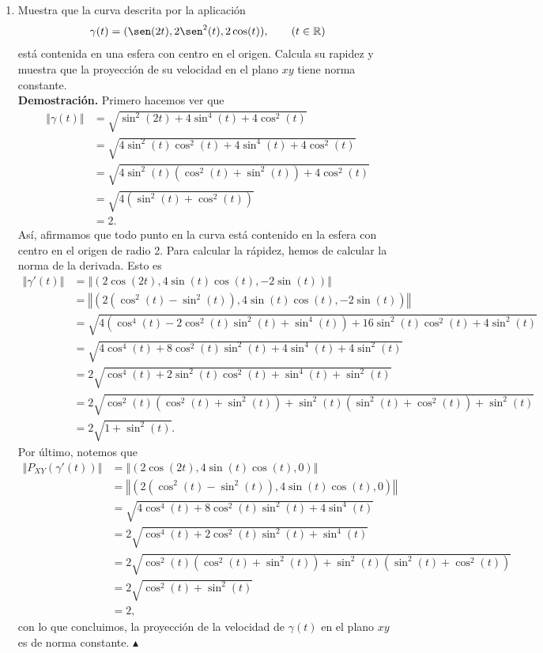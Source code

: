 \documentclass[12pt]{article}
\newcommand{\norm}[1]{\left\Vert#1\right\Vert}
\newcommand{\R}{\mathbb R}
\begin{document}
\begin{enumerate}
\newpage
\item Muestra que la curva descrita por la aplicaci\'on 
\[ \gamma(t) = (\sen(2t),2\sen^2(t),2\cos(t)),\qquad (t\in \R) \] 
est\'a contenida en una esfera con centro en el origen. Calcula su rapidez y muestra que la proyecci\'on de su velocidad en el plano $xy$ tiene norma constante. \\
\textbf{Demostración.} Primero hacemos ver que
\begin{align*}
    \norm{\gamma(t)} &= \sqrt{\sin^2(2t)+4\sin^4(t)+4\cos^2(t)} \\
    &= \sqrt{4\sin^2(t)\cos^2(t)+4\sin^4(t)+4\cos^2(t)} \\
    &= \sqrt{4\sin^2(t)(\cos^2(t)+\sin^2(t))+4\cos^2(t)} \\
    &= \sqrt{4(\sin^2(t)+\cos^2(t))} \\
    &= 2.
\end{align*}
Así, afirmamos que todo punto en la curva está contenido en la esfera con centro en el origen de radio 2.
Para calcular la rápidez, hemos de calcular la norma de la derivada. Esto es
\begin{align*}
    \norm{\gamma'(t)} &= \norm{\left(2\cos(2t),4\sin(t)\cos(t),-2\sin(t)\right)} \\
    &= \norm{\left(2\left(\cos^2(t)-\sin^2(t)\right),4\sin(t)\cos(t),-2\sin(t)\right)} \\
    &= \sqrt{4\left(\cos^4(t)-2\cos^2(t)\sin^2(t)+\sin^4(t)\right)+16\sin^2(t)\cos^2(t)+4\sin^2(t)} \\
    &= \sqrt{4\cos^4(t)+8\cos^2(t)\sin^2(t) + 4\sin^4(t) + 4\sin^2(t)} \\
    &= 2\sqrt{\cos^4(t)+2\sin^2(t)\cos^2(t)+\sin^4(t)+\sin^2(t)} \\
    &= 2\sqrt{\cos^2(t)\left(\cos^2(t)+\sin^2(t)\right)+\sin^2(t)(\sin^2(t)+\cos^2(t))+\sin^2(t)} \\
    &= 2\sqrt{1+\sin^2(t)}.
\end{align*}
Por último, notemos que
\begin{align*}
    \norm{P_{XY}\left(\gamma'(t)\right)} &= \norm{\left(2\cos(2t),4\sin(t)\cos(t),0\right)} \\
    &= \norm{\left(2\left(\cos^2(t)-\sin^2(t)\right),4\sin(t)\cos(t),0\right)} \\
    &= \sqrt{4\cos^4(t)+8\cos^2(t)\sin^2(t)+4\sin^4(t)} \\
    &= 2\sqrt{\cos^4(t)+2\cos^2(t)\sin^2(t)+\sin^4(t)} \\
    &= 2\sqrt{\cos^2(t)\left(\cos^2(t)+\sin^2(t)\right)+\sin^2(t)\left(\sin^2(t)+\cos^2(t)\right)} \\
    &= 2\sqrt{\cos^2(t)+\sin^2(t)} \\
    &= 2,
\end{align*}
con lo que concluimos, la proyección de la velocidad de $\gamma(t)$ en el plano $xy$ es de norma constante. \hfill $\blacktriangle$



\end{enumerate}
\end{document}

